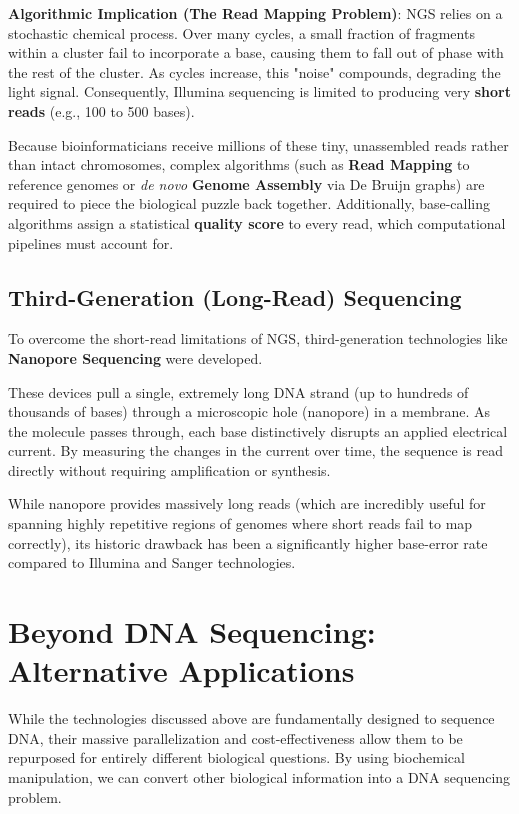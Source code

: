 \sta \textbf{Algorithmic Implication (The Read Mapping Problem)}: NGS relies on a stochastic chemical process. Over many cycles, a small fraction of fragments within a cluster fail to incorporate a base, causing them to fall out of phase with the rest of the cluster. As cycles increase, this "noise" compounds, degrading the light signal. Consequently, Illumina sequencing is limited to producing very \textbf{short reads} (e.g., 100 to 500 bases). 

Because bioinformaticians receive millions of these tiny, unassembled reads rather than intact chromosomes, complex algorithms (such as \textbf{Read Mapping} to reference genomes or \textit{de novo} \textbf{Genome Assembly} via De Bruijn graphs) are required to piece the biological puzzle back together. Additionally, base-calling algorithms assign a statistical \textbf{quality score} to every read, which computational pipelines must account for.

\subsection{Third-Generation (Long-Read) Sequencing}
To overcome the short-read limitations of NGS, third-generation technologies like \textbf{Nanopore Sequencing} were developed. 

These devices pull a single, extremely long DNA strand (up to hundreds of thousands of bases) through a microscopic hole (nanopore) in a membrane. As the molecule passes through, each base distinctively disrupts an applied electrical current. By measuring the changes in the current over time, the sequence is read directly without requiring amplification or synthesis.

While nanopore provides massively long reads (which are incredibly useful for spanning highly repetitive regions of genomes where short reads fail to map correctly), its historic drawback has been a significantly higher base-error rate compared to Illumina and Sanger technologies.

\section{Beyond DNA Sequencing: Alternative Applications}

While the technologies discussed above are fundamentally designed to sequence DNA, their massive parallelization and cost-effectiveness allow them to be repurposed for entirely different biological questions. By using biochemical manipulation, we can convert other biological information into a DNA sequencing problem.

